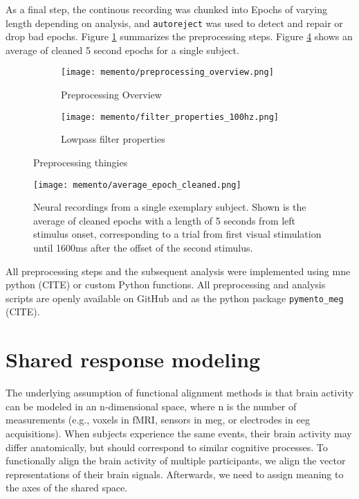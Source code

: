 As a final step, the continous recording was chunked into Epochs of varying length depending on analysis, and \texttt{autoreject} was used to detect and repair or drop bad epochs.
Figure \ref{fig:preproc} summarizes the preprocessing steps.
Figure \ref{fig:cleanepoch} shows an average of cleaned 5 second epochs for a single subject.



\begin{figure}
	\begin{subfigure}{0.4\textwidth}
		\texttt{[image: memento/preprocessing\_overview.png]}
		\caption[Preprocessing overview]{Preprocessing Overview}
		\label{fig:preproc}
	\end{subfigure}
	\begin{subfigure}{0.4\textwidth}
		\texttt{[image: memento/filter\_properties\_100hz.png]}
		\caption[Lowpass filter properties]{Lowpass filter properties}
		\label{fig:filter}
	\end{subfigure}
	\caption[Preprocessing]{Preprocessing thingies}
\end{figure}

\begin{figure}
	\centering
	\texttt{[image: memento/average\_epoch\_cleaned.png]}
	\caption[Average neural signal over the trial course]{Neural recordings from a single exemplary subject.
		Shown is the average of cleaned epochs with a length of 5 seconds from left stimulus onset, corresponding to a trial from first visual stimulation until
		1600ms after the offset of the second stimulus.}
	\label{fig:cleanepoch}
\end{figure}

All preprocessing steps and the subsequent analysis were implemented using mne python (CITE) or custom Python functions. All preprocessing and analysis scripts are openly available on GitHub and as the python package \texttt{pymento\_meg} (CITE).


\pagebreak

\section{Shared response modeling}

The underlying assumption of functional alignment methods is that brain activity can be modeled in an n-dimensional space, where n is the number of measurements (e.g., voxels in \gls{fMRI}, sensors in \gls{meg}, or electrodes in \gls{eeg} acquisitions).
When subjects experience the same events, their brain activity may differ anatomically, but should correspond to similar cognitive processes.
To functionally align the brain activity of multiple participants, we align the vector representations of their brain signals.
Afterwards, we need to assign meaning to the axes of the shared space.

